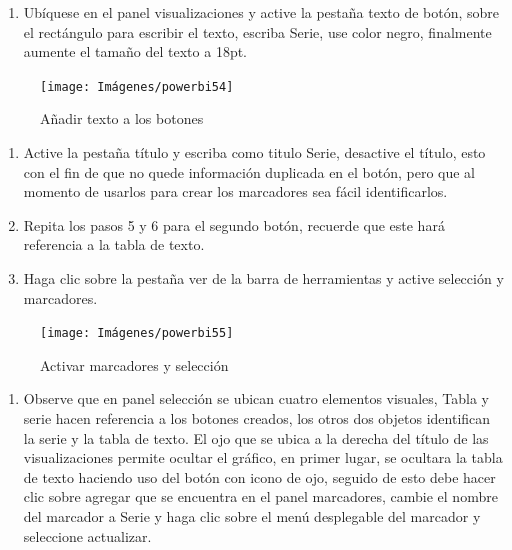 \documentclass[
]{book}
\providecommand{\tightlist}{%
  \setlength{\itemsep}{0pt}\setlength{\parskip}{0pt}}
\begin{document}
\begin{enumerate}
\def\labelenumi{\arabic{enumi}.}
\setcounter{enumi}{4}
\tightlist
\item
  Ubíquese en el panel visualizaciones y active la pestaña texto de botón, sobre el rectángulo para escribir el texto, escriba Serie, use color negro, finalmente aumente el tamaño del texto a 18pt.
\end{enumerate}

\begin{figure}

{\centering \texttt{[image: Imágenes/powerbi54]} 

}

\caption{Añadir texto a los botones}\label{fig:paso5alternancia-fig}
\end{figure}

\begin{enumerate}
\def\labelenumi{\arabic{enumi}.}
\setcounter{enumi}{5}
\item
  Active la pestaña título y escriba como titulo Serie, desactive el título, esto con el fin de que no quede información duplicada en el botón, pero que al momento de usarlos para crear los marcadores sea fácil identificarlos.
\item
  Repita los pasos 5 y 6 para el segundo botón, recuerde que este hará referencia a la tabla de texto.
\item
  Haga clic sobre la pestaña ver de la barra de herramientas y active selección y marcadores.
\end{enumerate}

\begin{figure}

{\centering \texttt{[image: Imágenes/powerbi55]} 

}

\caption{Activar marcadores y selección}\label{fig:paso8alternancia-fig}
\end{figure}

\begin{enumerate}
\def\labelenumi{\arabic{enumi}.}
\setcounter{enumi}{8}
\tightlist
\item
  Observe que en panel selección se ubican cuatro elementos visuales, Tabla y serie hacen referencia a los botones creados, los otros dos objetos identifican la serie y la tabla de texto. El ojo que se ubica a la derecha del título de las visualizaciones permite ocultar el gráfico, en primer lugar, se ocultara la tabla de texto haciendo uso del botón con icono de ojo, seguido de esto debe hacer clic sobre agregar que se encuentra en el panel marcadores, cambie el nombre del marcador a Serie y haga clic sobre el menú desplegable del marcador y seleccione actualizar.
\end{enumerate}
\end{document}
